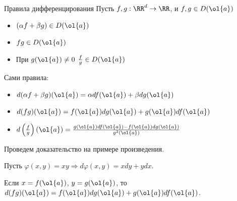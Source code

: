 \begin{prop}{Правила дифференцирования}{}
    Пусть \( f, g : \RR^d \to \RR \), и \( f, g \in D(\ol{a}) \)

    \begin{itemize}
        \item
            \( (\alpha f + \beta g) \in D(\ol{a}) \)
        \item
            \( fg \in D(\ol{a}) \)
        \item
            При \( g(\ol{a}) \neq 0 \) \( \frac{f}{g} \in D(\ol{a}) \)
    \end{itemize}

    Сами правила:
    \begin{itemize}
        \item
            \( d (\alpha f + \beta g) ( \ol{a} ) = \alpha df (\ol{a}) + \beta dg (\ol{a}) \)
        \item
            \( d (fg) ( \ol{a} ) = f(\ol{a}) dg(\ol{a}) + g(\ol{a}) df (\ol{a}) \)
        \item
            \( d \left( \frac{f}{g} \right) ( \ol{a} ) = \frac{g(\ol{a}) df (\ol{a}) - f(\ol{a}) dg (\ol{a}) }{g^2(\ol{a})} \)
    \end{itemize}
\end{prop}

Проведем доказательство на примере произведения.

Пусть \( \varphi(x, y) = xy \Rightarrow d \varphi (x, y) = x dy + y dx \).

Если \( x = f(\ol{a}) \), \( y = g(\ol{a}) \),
то \( d (fg) (\ol{a}) = f (\ol{a}) dg (\ol{a}) + g (\ol{a}) df (\ol{a}) \).

